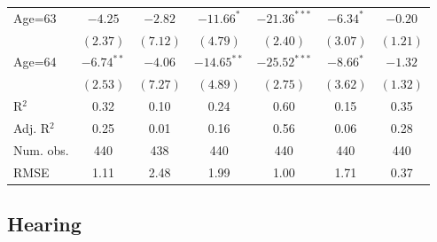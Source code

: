 \documentclass[fullpage]{paper}
\begin{document}
\begin{center}
\begin{longtable}{l c c c c c c }
Age=63      & $-4.25$       & $-2.82$       & $-11.66^{*}$   & $-21.36^{***}$ & $-6.34^{*}$    & $-0.20$       \\
            & $(2.37)$      & $(7.12)$      & $(4.79)$       & $(2.40)$       & $(3.07)$       & $(1.21)$      \\
Age=64      & $-6.74^{**}$  & $-4.06$       & $-14.65^{**}$  & $-25.52^{***}$ & $-8.66^{*}$    & $-1.32$       \\
            & $(2.53)$      & $(7.27)$      & $(4.89)$       & $(2.75)$       & $(3.62)$       & $(1.32)$      \\
\hline
R$^2$       & 0.32          & 0.10          & 0.24           & 0.60           & 0.15           & 0.35          \\
Adj. R$^2$  & 0.25          & 0.01          & 0.16           & 0.56           & 0.06           & 0.28          \\
Num. obs.   & 440           & 438           & 440            & 440            & 440            & 440           \\
RMSE        & 1.11          & 2.48          & 1.99           & 1.00           & 1.71           & 0.37          \\
\end{longtable}
\end{center}
\subsection{ Hearing }
\end{document}
